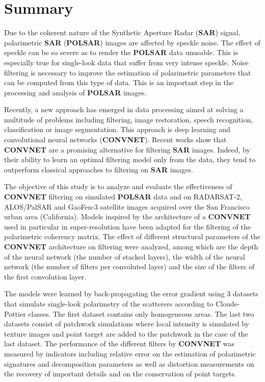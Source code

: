 \chapter*{Summary}

Due to the coherent nature of the Synthetic Aperture Radar (\textbf{SAR}) signal, polarimetric \textbf{SAR} (\textbf{POLSAR}) images are affected by speckle noise. The effect of speckle can be so severe as to render the \textbf{POLSAR} data unusable. This is especially true for single-look data that suffer from very intense speckle. Noise filtering is necessary to improve the estimation of polarimetric parameters that can be computed from this type of data. This is an important step in the processing and analysis of \textbf{POLSAR} images. 

Recently, a new approach has emerged in data processing aimed at solving a multitude of problems including filtering, image restoration, speech recognition, classification or image segmentation.  This approach is deep learning and convolutional neural networks (\textbf{CONVNET}). Recent works show that \textbf{CONVNET} are a promising alternative for filtering \textbf{SAR} images.  Indeed, by their ability to learn an optimal filtering model only from the data, they tend to outperform classical approaches to filtering on \textbf{SAR} images.

The objective of this study is to analyze and evaluate the effectiveness of \textbf{CONVNET} filtering on simulated \textbf{POLSAR} data and on RADARSAT-2, ALOS/PalSAR and GaoFen-3 satellite images acquired over the San Francisco urban area (California).   Models inspired by the architecture of a \textbf{CONVNET} used in particular in super-resolution have been adapted for the filtering of the polarimetric coherency matrix. The effect of different structural parameters of the \textbf{CONVNET} architecture on filtering were analyzed, among which are the depth of the neural network (the number of stacked layers), the width of the  neural network (the number of filters per convoluted layer) and the size of the filters of the first convolution layer.  

The models were learned by back-propagating the error gradient using 3 datasets that simulate single-look polarimetry of the scatterers according to Cloude-Pottier classes. The first dataset contains only homogeneous areas.  The last two datasets consist of patchwork simulations where local intensity is simulated by texture images and point target are added to the patchwork in the case of the last dataset. The performance of the different filters by \textbf{CONVNET} was measured by indicators including relative error on the estimation of polarimetric signatures and decomposition parameters as well as distortion measurements on the recovery of important details and on the conservation of point targets. 

